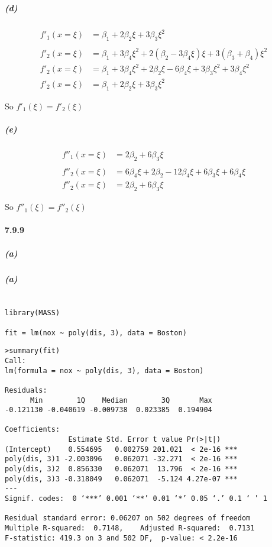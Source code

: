 \documentclass[11pt]{article}
\begin{document}
\subparagraph{(d)}
\begin{align*}
f'_1(x = \xi) &= \beta_1 + 2\beta_2\xi + 3\beta_3\xi^2\\\\
f'_2(x = \xi) &= \beta_1 + 3\beta_4\xi^2 + 2(\beta_2 - 3\beta_4\xi)\xi + 3(\beta_3 + \beta_4)\xi^2\\
f'_2(x = \xi) &= \beta_1 + 3\beta_4\xi^2 + 2\beta_2\xi - 6\beta_4\xi + 3\beta_3\xi^2 + 3\beta_4\xi^2\\
f'_2(x = \xi) &= \beta_1 + 2\beta_2\xi + 3\beta_3\xi^2
\end{align*}
\begin{center}
So $f'_1(\xi) = f'_2(\xi)$
\end{center}

\subparagraph{(e)}
\begin{align*}
f''_1(x = \xi) &= 2\beta_2 + 6\beta_3\xi\\\\
f''_2(x = \xi) &= 6\beta_4\xi + 2\beta_2 - 12\beta_4\xi + 6\beta_3\xi + 6\beta_4\xi\\
f''_2(x = \xi) &= 2\beta_2 + 6\beta_3\xi
\end{align*}
\begin{center}
So $f''_1(\xi) = f''_2(\xi)$
\end{center}

\paragraph{7.9.9}
\subparagraph{(a)}
\subparagraph{(a)}
\begin{lstlisting}

library(MASS)

fit = lm(nox ~ poly(dis, 3), data = Boston)
\end{lstlisting}
\begin{lstlisting}[basicstyle = \ttfamily\footnotesize]
>summary(fit)
Call:
lm(formula = nox ~ poly(dis, 3), data = Boston)

Residuals:
      Min        1Q    Median        3Q       Max 
-0.121130 -0.040619 -0.009738  0.023385  0.194904 

Coefficients:
               Estimate Std. Error t value Pr(>|t|)    
(Intercept)    0.554695   0.002759 201.021  < 2e-16 ***
poly(dis, 3)1 -2.003096   0.062071 -32.271  < 2e-16 ***
poly(dis, 3)2  0.856330   0.062071  13.796  < 2e-16 ***
poly(dis, 3)3 -0.318049   0.062071  -5.124 4.27e-07 ***
---
Signif. codes:  0 ‘***’ 0.001 ‘**’ 0.01 ‘*’ 0.05 ‘.’ 0.1 ‘ ’ 1

Residual standard error: 0.06207 on 502 degrees of freedom
Multiple R-squared:  0.7148,	Adjusted R-squared:  0.7131 
F-statistic: 419.3 on 3 and 502 DF,  p-value: < 2.2e-16
\end{lstlisting}
\end{document}
